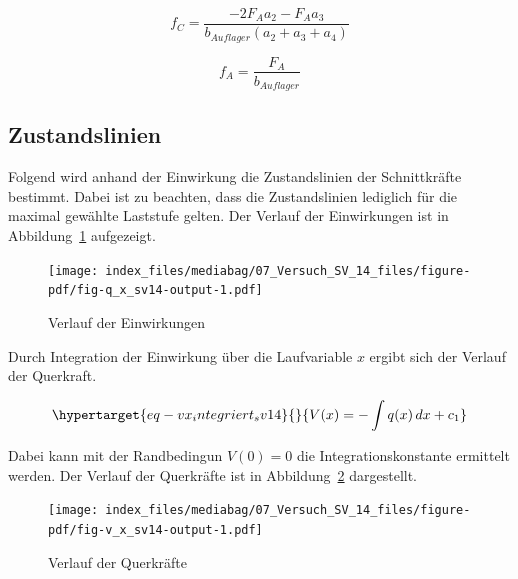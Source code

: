 \documentclass[
  12pt,
  letterpaper,
  egregdoesnotlikesansseriftitles]{scrreprt}
\begin{document}
\begin{equation}f_{C} = \frac{- 2 F_{A} a_{2} - F_{A} a_{3}}{b_{Auflager} \left(a_{2} + a_{3} + a_{4}\right)}\end{equation}

\begin{equation}f_{A} = \frac{F_{A}}{b_{Auflager}}\end{equation}

\hypertarget{zustandslinien-1}{%
\subsection{Zustandslinien}\label{zustandslinien-1}}

Folgend wird anhand der Einwirkung die Zustandslinien der Schnittkräfte
bestimmt. Dabei ist zu beachten, dass die Zustandslinien lediglich für
die maximal gewählte Laststufe gelten. Der Verlauf der Einwirkungen ist
in Abbildung~\ref{fig-q_x_sv14} aufgezeigt.

\begin{figure}[H]

{\centering \texttt{[image: index\_files/mediabag/07\_Versuch\_SV\_14\_files/figure-pdf/fig-q\_x\_sv14-output-1.pdf]}

}

\caption{\label{fig-q_x_sv14}Verlauf der Einwirkungen}

\end{figure}

Durch Integration der Einwirkung über die Laufvariable \(x\) ergibt sich
der Verlauf der Querkraft.

\begin{equation}\protect\hypertarget{eq-vx_integriert_sv14}{}{
V(x) = -\int q(x) \, dx + c_1
}\label{eq-vx_integriert_sv14}\end{equation}

Dabei kann mit der Randbedingun \(V(0) = 0\) die Integrationskonstante
ermittelt werden. Der Verlauf der Querkräfte ist in
Abbildung~\ref{fig-v_x_sv14} dargestellt.

\begin{figure}[H]

{\centering \texttt{[image: index\_files/mediabag/07\_Versuch\_SV\_14\_files/figure-pdf/fig-v\_x\_sv14-output-1.pdf]}

}

\caption{\label{fig-v_x_sv14}Verlauf der Querkräfte}

\end{figure}
\end{document}
